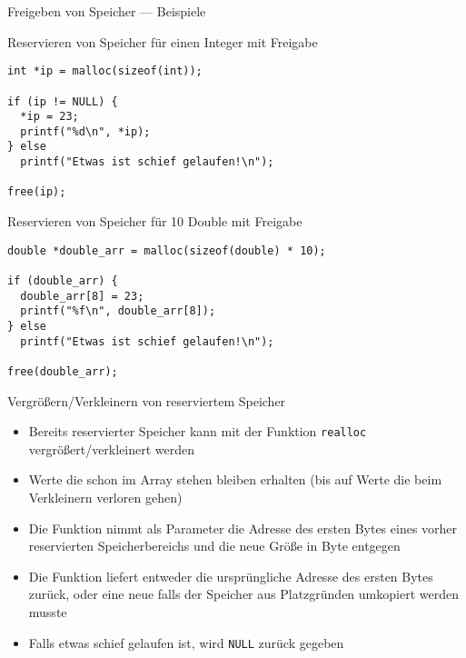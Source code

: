 \documentclass[presentation]{beamer}
\begin{document}
\begin{frame}[label={sec:orgd6f634a},fragile]{Freigeben von Speicher --- Beispiele}
 \begin{block}{Reservieren von Speicher für einen Integer mit Freigabe}
\begin{verbatim}
int *ip = malloc(sizeof(int));

if (ip != NULL) {
  *ip = 23;
  printf("%d\n", *ip);
} else
  printf("Etwas ist schief gelaufen!\n");

free(ip);
\end{verbatim}
\end{block}
\begin{block}{Reservieren von Speicher für 10 Double mit Freigabe}
\begin{verbatim}
double *double_arr = malloc(sizeof(double) * 10);

if (double_arr) {
  double_arr[8] = 23;
  printf("%f\n", double_arr[8]);
} else
  printf("Etwas ist schief gelaufen!\n");

free(double_arr);
\end{verbatim}
\end{block}
\end{frame}
\begin{frame}[label={sec:org7f66b8c},fragile]{Vergrößern/Verkleinern von reserviertem Speicher}
 \begin{itemize}
\item Bereits reservierter Speicher kann mit der Funktion {\color{solarizedYellow}\verb!realloc!}
vergrößert/verkleinert werden
\item Werte die schon im Array stehen bleiben erhalten (bis auf Werte die
beim Verkleinern verloren gehen)
\item Die Funktion nimmt als Parameter die Adresse des ersten Bytes eines
vorher reservierten Speicherbereichs und die neue Größe in Byte
entgegen
\item Die Funktion liefert entweder die ursprüngliche Adresse des ersten
Bytes zurück, oder eine neue falls der Speicher aus Platzgründen
umkopiert werden musste
\item Falls etwas schief gelaufen ist, wird {\color{solarizedYellow}\verb!NULL!} zurück gegeben
\end{itemize}
\end{frame}
\end{document}

